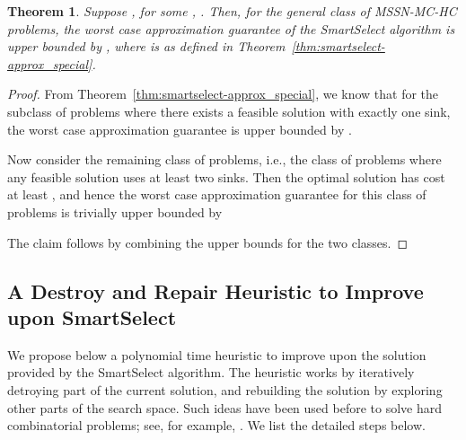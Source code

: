 \documentclass[conference]{IEEEtran}
\newtheorem{theorem}{Theorem}
\begin{document}
\begin{theorem}
\label{thm:smartselect-approx_general}
Suppose , for some , . Then, for the general class of MSSN-MC-HC problems, the worst case approximation guarantee of the SmartSelect algorithm is upper bounded by , where  is as defined in Theorem~\ref{thm:smartselect-approx_special}.
\end{theorem}

\begin{proof}
From Theorem~\ref{thm:smartselect-approx_special}, we know that for the subclass of problems where there exists a feasible solution with exactly one sink, the worst case approximation guarantee is upper bounded by .

Now consider the remaining class of problems, i.e., the class of problems where any feasible solution uses at least two sinks. Then the optimal solution has cost at least , and hence the worst case approximation guarantee for this class of problems is trivially upper bounded by



The claim follows by combining the upper bounds for the two classes. 
\end{proof}

\subsection{A Destroy and Repair Heuristic to Improve upon SmartSelect}
\label{subsec:d-r}
We propose below a polynomial time heuristic to improve upon the solution provided by the SmartSelect algorithm. The heuristic works by iteratively detroying part of the current solution, and rebuilding the solution by exploring other parts of the search space. Such ideas have been used before to solve hard combinatorial problems; see, for example, \cite{Costa}. We list the detailed steps below.
\end{document}
